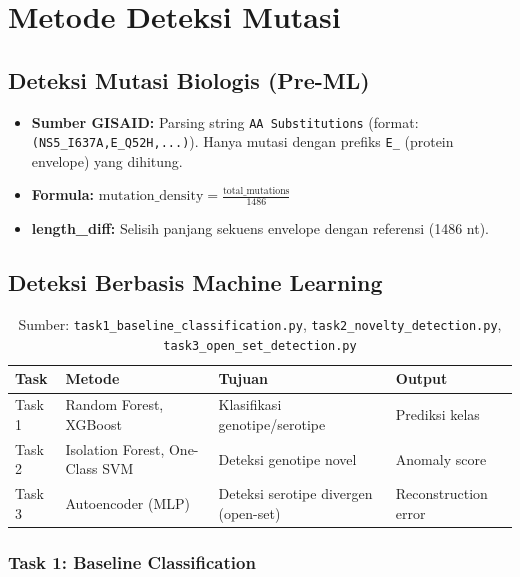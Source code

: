 \documentclass[12pt,a4paper]{article}
\begin{document}
\section{Metode Deteksi Mutasi}

\subsection{Deteksi Mutasi Biologis (Pre-ML)}

\begin{itemize}
    \item \textbf{Sumber GISAID:} Parsing string \texttt{AA Substitutions} (format: \texttt{(NS5\_I637A,E\_Q52H,...)}). Hanya mutasi dengan prefiks \texttt{E\_} (protein envelope) yang dihitung.
    \item \textbf{Formula:} $\text{mutation\_density} = \frac{\text{total\_mutations}}{1486}$
    \item \textbf{length\_diff:} Selisih panjang sekuens envelope dengan referensi (1486 nt).
\end{itemize}

\subsection{Deteksi Berbasis Machine Learning}

\begin{table}[h]
\centering
\caption{Sumber: \texttt{task1\_baseline\_classification.py}, \texttt{task2\_novelty\_detection.py}, \texttt{task3\_open\_set\_detection.py}}
\begin{tabular}{@{}llll@{}}
\toprule
\textbf{Task} & \textbf{Metode} & \textbf{Tujuan} & \textbf{Output} \\
\midrule
Task 1 & Random Forest, XGBoost & Klasifikasi genotipe/serotipe & Prediksi kelas \\
Task 2 & Isolation Forest, One-Class SVM & Deteksi genotipe novel & Anomaly score \\
Task 3 & Autoencoder (MLP) & Deteksi serotipe divergen (open-set) & Reconstruction error \\
\bottomrule
\end{tabular}
\end{table}

\subsubsection{Task 1: Baseline Classification}
\end{document}

